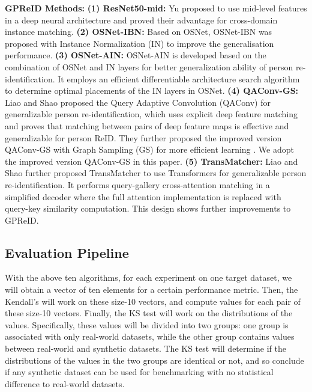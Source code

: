 \documentclass[10pt,twocolumn,letterpaper]{article}
\begin{document}
\textbf{GPReID Methods:}
\textbf{(1) ResNet50-mid:} Yu \etal \cite{yu2017devil} proposed to use mid-level features in a deep neural architecture and proved their advantage for cross-domain instance matching. 
\textbf{(2) OSNet-IBN:} Based on OSNet, OSNet-IBN \cite{Zhou2019-OSNet} was proposed with Instance Normalization (IN) \cite{pan2018two} to improve the generalisation performance.
\textbf{(3) OSNet-AIN:} OSNet-AIN \cite{zhou2021osnet} is developed based on the combination of OSNet and IN layers for better generalization ability of person re-identification. It employs an efficient differentiable architecture search algorithm to determine optimal placements of the IN layers in OSNet.
\textbf{(4) QAConv-GS:} Liao and Shao \cite{liao2020interpretable} proposed the Query Adaptive Convolution (QAConv) for generalizable person re-identification, which uses explicit deep feature matching and proves that matching between pairs of deep feature maps is effective and generalizable for person ReID. They further proposed the improved version QAConv-GS with Graph Sampling (GS) for more efficient learning \cite{Liao-2021-QAConv-GS}. We adopt the improved version QAConv-GS in this paper.
\textbf{(5) TransMatcher:} Liao and Shao \cite{liao2021transmatcher} further proposed TransMatcher to use Transformers for generalizable person re-identification. It performs query-gallery cross-attention matching in a simplified decoder where the full attention implementation is replaced with query-key similarity computation. This design shows further improvements to GPReID.

\subsection{Evaluation Pipeline}
With the above ten algorithms, for each experiment on one target dataset, we will obtain a vector of ten elements for a certain performance metric. Then, the Kendall's  will work on these size-10 vectors, and compute  values for each pair of these size-10 vectors. Finally, the KS test will work on the distributions of the  values. Specifically, these  values will be divided into two groups: one group is associated with only real-world datasets, while the other group contains  values between real-world and synthetic datasets. The KS test will determine if the distributions of the  values in the two groups are identical or not, and so conclude if any synthetic dataset can be used for benchmarking with no statistical difference to real-world datasets.
\end{document}
